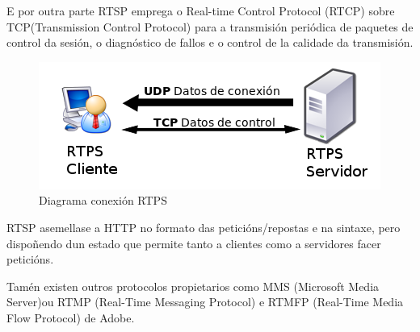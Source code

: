             E por outra parte RTSP emprega o Real-time Control Protocol (RTCP) sobre TCP(Transmission 
            Control Protocol) para a transmisión periódica de paquetes de control da sesión, o
            diagnóstico de fallos e o control de la calidade da transmisión.
            
            \begin{figure}[htp]
            \begin{center}
                \includegraphics[scale=0.6]{figures/RTPS-diagram.png}
                \caption{Diagrama conexión RTPS}
            \label{fig:RTPS-diagram}
            \end{center}
            \end{figure}
            
            RTSP asemellase a HTTP no formato das peticións/repostas e na sintaxe, pero dispoñendo 
            dun estado que permite tanto a clientes como a servidores facer peticións.

            Tamén existen outros protocolos propietarios como MMS (Microsoft Media Server)ou RTMP 
            (Real-Time Messaging Protocol) e RTMFP (Real-Time Media Flow Protocol) de Adobe.
            